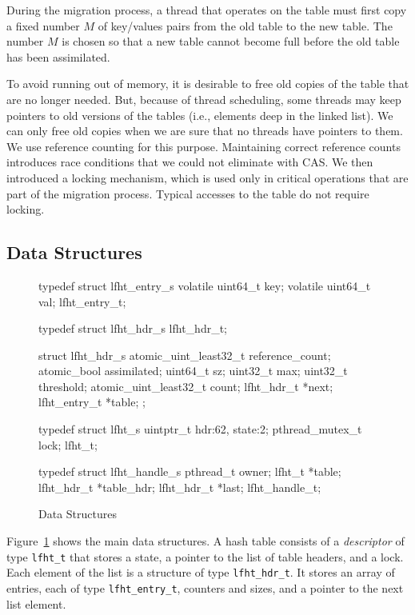 During the migration process, a thread that operates on the table must
first copy a fixed number $M$ of key/values pairs from the old table
to the new table. The number $M$ is chosen so that a new table cannot
become full before the old table has been assimilated.

To avoid running out of memory, it is desirable to free old copies of
the table that are no longer needed. But, because of thread
scheduling, some threads may keep pointers to old versions of the
tables (i.e., elements deep in the linked list). We can only free old
copies when we are sure that no threads have pointers to them. We use
reference counting for this purpose. Maintaining correct reference
counts introduces race conditions that we could not eliminate with
CAS.  We then introduced a locking mechanism, which is used only in
critical operations that are part of the migration process. Typical
accesses to the table do not require locking.


\subsection{Data Structures}

\begin{figure}
\begin{center}
\begin{clisting}
typedef struct lfht_entry_s {
  volatile uint64_t  key;
  volatile uint64_t  val;
} lfht_entry_t;

typedef struct lfht_hdr_s lfht_hdr_t;

struct lfht_hdr_s {
  atomic_uint_least32_t reference_count;
  atomic_bool assimilated;
  uint64_t sz;
  uint32_t max;
  uint32_t threshold;
  atomic_uint_least32_t count;
  lfht_hdr_t *next;
  lfht_entry_t *table;
};

typedef struct lfht_s {
  uintptr_t hdr:62, state:2;
  pthread_mutex_t lock;
} lfht_t;

typedef struct lfht_handle_s {
  pthread_t owner;
  lfht_t *table;
  lfht_hdr_t *table_hdr;
  lfht_hdr_t *last;  
} lfht_handle_t;
\end{clisting}
\end{center}
\caption{Data Structures}
\label{fig:datastructures}
\end{figure}

Figure~\ref{fig:datastructures} shows the main data structures. A hash
table consists of a {\em descriptor\/} of type \texttt{lfht\_t} that
stores a state, a pointer to the list of table headers, and a lock. Each
element of the list is a structure of type \texttt{lfht\_hdr\_t}. It
stores an array of entries, each of type \texttt{lfht\_entry\_t}, counters and sizes, and a pointer to the
next list element.

